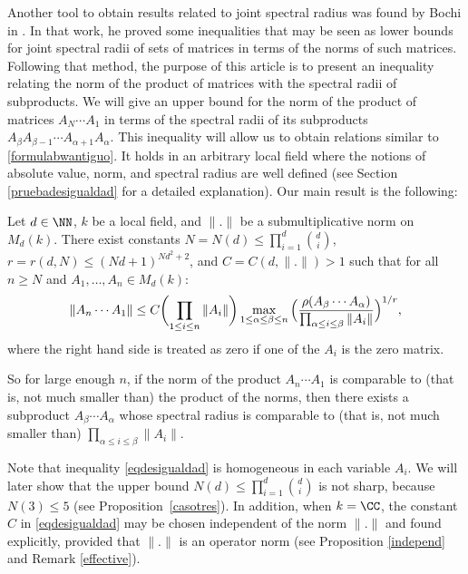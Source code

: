 Another tool to obtain results related to joint spectral radius was found by Bochi in \cite{bociineq}. In that work, he proved some inequalities that may be seen as lower bounds for joint spectral radii of sets of matrices in terms of the norms of such matrices. Following that method, the purpose of this article is to present an inequality relating the norm of the product of matrices with the spectral radii of subproducts. We will give an upper bound for the norm of the product of matrices $A_N\cdots A_1$ in terms of the spectral radii of its subproducts $A_{\beta}A_{\beta-1}\cdots A_{\alpha+1}A_{\alpha}$. This inequality will allow us to obtain relations similar to \eqref{formulabwantiguo}. It holds in an arbitrary local field where the notions of absolute value, norm, and spectral radius are well defined (see Section \ref{pruebadesigualdad} for a detailed explanation). Our main result is the following:

\begin{teo}\label{desigualdad} Let $d \in \NN$, $k$ be a local field, and $\|.\|$ be a submultiplicative norm on $M_{d}(k)$. There exist constants $N = N(d)\leq \prod^{d}_{i=1}{\binom{d}{i}}$, $r = r(d,N) \leq (Nd+1)^{Nd^2+2}$, and $C = C(d,\|.\|) > 1$ such that for all $n\geq N$ and $A_1,\dots, A_n \in M_{d}(k)$:
\begin{equation}\label{eqdesigualdad}
\|A_n\cdots A_1\| \leq C \biggl(\prod_{1\leq i\leq n}{\|A_i\|}\biggr)\max_{1\leq \alpha\leq \beta\leq n}{ \Bigl( \frac{\rho(A_{\beta}\cdots A_{\alpha}) }{ \prod_{\alpha\leq i\leq \beta}{\|A_i\|}} \Bigr)^{1/r}},
\end{equation}
where the right hand side is treated as zero if one of the $A_{i}$ is the zero matrix.
\end{teo}
So for large enough $n$, if the norm of the product $A_n\cdots A_1$ is comparable to (that is, not much smaller than) the product of the norms, then there exists a subproduct $A_{\beta}\cdots A_{\alpha}$ whose spectral radius is comparable to (that is, not much smaller than) $\prod_{\alpha\leq i \leq \beta}{\|A_{i}\|}$.

Note that inequality \eqref{eqdesigualdad} is homogeneous in each variable $A_{i}$. We will later show that the upper bound $N(d)\leq \prod^{d}_{i=1}{\binom{d}{i}}$ is not sharp, because $N(3)\leq 5$ (see Proposition~\ref{casotres}). In addition, when $k=\CC$, the constant $C$ in \eqref{eqdesigualdad} may be chosen independent of the norm $\|.\|$ and found explicitly, provided that $\|.\|$ is an operator norm (see Proposition \ref{independ} and Remark \ref{effective}).

